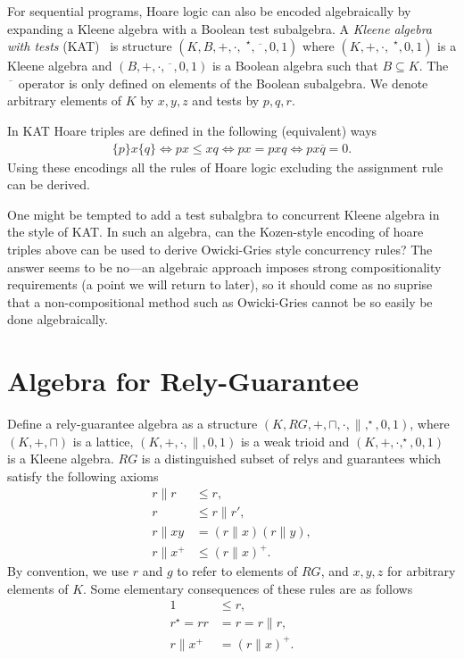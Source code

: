 \documentclass{llncs}
\begin{document}
For sequential programs, Hoare logic can also be encoded algebraically by
expanding a Kleene algebra with a Boolean test subalgebra. A
\emph{Kleene algebra with tests} (KAT)~\cite{kozen_kleene_1997} is structure
$(K,B,+,\cdot,\phantom{|}^\star,\overline{\phantom{x}},0,1)$ where
$(K,+,\cdot,\phantom{|}^\star,0,1)$ is a Kleene algebra and
$(B,+,\cdot,\overline{\phantom{x}},0,1)$ is a Boolean algebra such
that $B \subseteq K$. The $\overline{\phantom{x}}$ operator is only
defined on elements of the Boolean subalgebra. We denote arbitrary
elements of $K$ by $x,y,z$ and tests by $p,q,r$.

In KAT Hoare triples are defined in the following (equivalent) ways
\begin{align*}
\{p\}x\{q\} \iff px \le xq \iff px = pxq \iff px\overline{q} = 0.
\end{align*}
Using these encodings all the rules of Hoare logic excluding the
assignment rule can be derived.

One might be tempted to add a test subalgbra to concurrent Kleene
algebra in the style of KAT. In such an algebra, can the Kozen-style
encoding of hoare triples above can be used to derive Owicki-Gries
style concurrency rules? The answer seems to be no---an algebraic
approach imposes strong compositionality requirements (a point we will
return to later), so it should come as no suprise that a
non-compositional method such as Owicki-Gries cannot be so easily be
done algebraically.

\section{Algebra for Rely-Guarantee}
\label{sec:RG}

Define a rely-guarantee algebra as a structure
$(K,RG,+,\sqcap,\cdot,\|,^\star,0,1)$, where $(K,+,\sqcap)$ is a
lattice, $(K,+,\cdot,\|,0,1)$ is a weak trioid and
$(K,+,\cdot,^\star,0,1)$ is a Kleene algebra. $RG$ is a distinguished
subset of relys and guarantees which satisfy the following axioms
\begin{align}
r\|r &\le r, \label{rg1}\\
r &\le r\|r', \label{rg2}\\
r\|xy &= (r\|x)(r\|y), \label{rg3}\\
r\|x^+ &\le (r\|x)^+ \label{rg4}.
\end{align}
By convention, we use $r$ and $g$ to refer to elements of $RG$, and
$x,y,z$ for arbitrary elements of $K$. Some elementary consequences of these rules are as follows
\begin{align*}
1 &\le r,\\
r^\star = rr &= r = r\|r,\\
r\|x^+ &= (r\|x)^+.
\end{align*}
\end{document}
